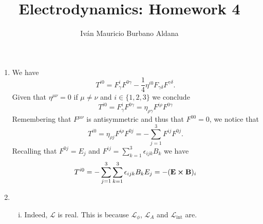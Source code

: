 \documentclass{article}
\title{Electrodynamics: Homework 4}
\author{Iván Mauricio Burbano Aldana}
\begin{document}
\maketitle

\begin{enumerate}

\item We have
\begin{equation}
T^{i0}=F^i_\gamma F^{0\gamma}-\frac{1}{4}\eta^{i0}F_{\gamma\delta}F^{\gamma\delta}.
\end{equation}
Given that $\eta^{\mu\nu}=0$ if $\mu\neq\nu$ and $i\in\{1,2,3\}$ we conclude
\begin{equation}
T^{i0}=F^i_\gamma F^{0\gamma}=\eta_{\rho\gamma}F^{i\rho}F^{0\gamma}
\end{equation}
Remembering that $F^{\mu\nu}$ is antisymmetric and thus that $F^{00}=0$, we notice that
\begin{equation}
T^{i0}=\eta_{\rho j}F^{i\rho}F^{0j}=-\sum_{j=1}^3F^{ij}F^{0j}.
\end{equation}
Recalling that $F^{0j}=E_j$ and $F^{ij}=\sum_{k=1}^3\epsilon_{ijk}B_k$ we have
\begin{equation}
T^{i0}=-\sum_{j=1}^3\sum_{k=1}^3\epsilon_{ijk}B_kE_j=-(\vb{E}\cross\vb{B})_i
\end{equation}

\item \begin{enumerate}[(i)]

\item Indeed, $\mathcal{L}$ is real. This is because $\mathcal{L}_\phi$, $\mathcal{L}_A$ and $\mathcal{L}_{\text{int}}$ are.

\end{enumerate}

\end{enumerate}
\end{document}
